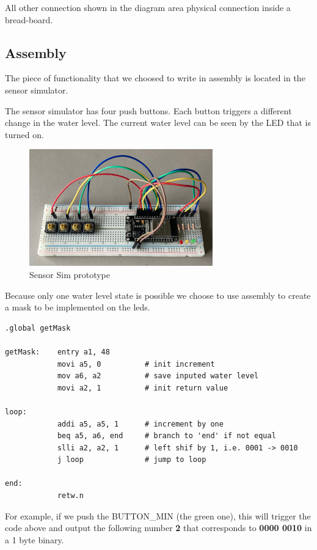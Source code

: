 \documentclass[11pt]{article}
\begin{document}
All other connection shown in the diagram area physical connection inside a bread-board.

\newpage
\subsection{Assembly}

The piece of functionality that we choosed to write in assembly is located in the sensor simulator.

The sensor simulator has four push buttons. Each button triggers a different change in the water level. 
The current water level can be seen by the LED that is turned on.

\begin{figure}[H]
  \centering
  \includegraphics[width=300px]{../diagrams/sensor-sim-01.jpg}
  \caption{Sensor Sim prototype}
  \label{fig:Sensor sim prototype}
\end{figure}

Because only one water level state is possible we choose to use assembly to create a mask to be implemented on the leds.

\begin{verbatim}
.global getMask

getMask:    entry a1, 48
            movi a5, 0          # init increment
            mov a6, a2          # save inputed water level
            movi a2, 1          # init return value

loop: 
            addi a5, a5, 1      # increment by one
            beq a5, a6, end     # branch to 'end' if not equal
            slli a2, a2, 1      # left shif by 1, i.e. 0001 -> 0010
            j loop              # jump to loop 

end:
            retw.n
\end{verbatim}

For example, if we push the BUTTON\_MIN (the green one), this will trigger the code above and output the following number \textbf{2} that corresponds to \textbf{0000 0010} in a 1 byte binary. 
\end{document}
